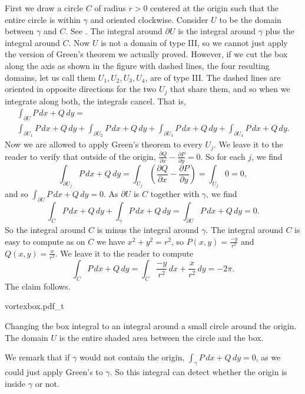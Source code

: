 \begin{example}
First we draw a circle $C$ of radius $r > 0$ centered at the origin such
that the entire circle is within $\gamma$ and oriented clockwise.
Consider $U$ to be the domain between $\gamma$ and $C$.
See .
The integral around $\partial U$ is the integral around $\gamma$ plus the
integral around $C$.
Now $U$ is not a domain of type III\@, so we cannot just apply the version of
Green's theorem we actually proved.
However, if we cut the box along the axis as shown in the figure with
dashed lines, the four resulting domains,
let us call them $U_1,U_2,U_3,U_4$,
are of type III\@.
The dashed lines are oriented in opposite directions
for the two $U_j$ that share them,
and so when we integrate along both,
 the integrals cancel.  That is,
\begin{multline*}
\int_{\partial U} P\, dx + Q \, dy
=
\\
\int_{\partial U_1} P\, dx + Q \, dy
+
\int_{\partial U_2} P\, dx + Q \, dy
+
\int_{\partial U_3} P\, dx + Q \, dy
+
\int_{\partial U_4} P\, dx + Q \, dy .
\end{multline*}
Now we are allowed to apply Green's theorem to every $U_j$.
We leave it to the reader to verify that outside of the origin,
$\frac{\partial Q}{\partial x} - \frac{\partial P}{\partial y} = 0$.
So for each $j$, we find
\begin{equation*}
\int_{\partial U_j} P\, dx + Q \, dy 
=
\int_{U_j} \left( \frac{\partial Q}{\partial x} - \frac{\partial P}{\partial
y} \right)
=
\int_{U_j} 0 = 0 ,
\end{equation*}
and so $\int_{\partial U} P\, dx + Q \, dy = 0$.
As $\partial U$ is $C$ together with $\gamma$, we find
\begin{equation*}
\int_C P \, dx + Q \, dy
+
\int_{\gamma} P \, dx + Q \, dy
=
\int_{\partial U} P \, dx + Q \, dy = 0 .
\end{equation*}
So the integral around $C$ is minus the integral around $\gamma$.  The
integral around $C$ is easy to compute as on $C$ we have $x^2+y^2 = r^2$,
so $P(x,y) = \frac{-y}{r^2}$ and $Q(x,y) = \frac{x}{r^2}$.
We leave it to the reader to compute
\begin{equation*}
\int_C P\, dx + Q \, dy
=
\int_C \frac{-y}{r^2}\, dx + \frac{x}{r^2} \, dy
=
- 2 \pi .
\end{equation*}
The claim follows.
\begin{myfigureht}
{vortexbox.pdf_t}
\caption{Changing the box integral to an integral around a small circle around
the origin.  The domain $U$ is the entire shaded area between the circle and the
box.\label{fig:vortexbox}}
\end{myfigureht}

We remark that if $\gamma$ would not contain the origin, $\int_\gamma
P\,dx+Q\,dy = 0$, as we could just apply Green's to $\gamma$.
So this integral can detect whether the origin is inside $\gamma$ or not.
\end{example}

